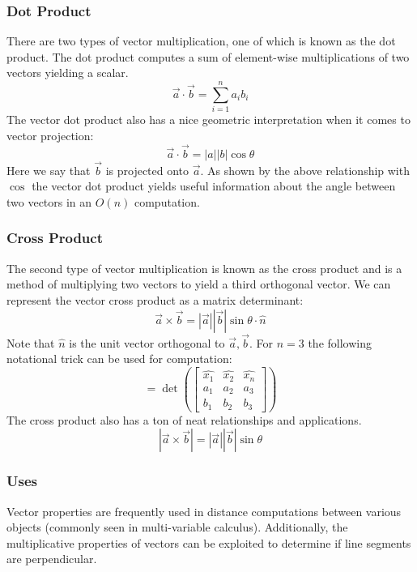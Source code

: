 \documentclass{article}
\begin{document}
\subsubsection{Dot Product}
There are two types of vector multiplication, one of which is known as the dot product. The dot product computes a sum of element-wise multiplications of two vectors yielding a scalar.
$$\vec{a}\cdot\vec{b}=\sum_{i=1}^{n}a_{i}b_{i}$$
The vector dot product also has a nice geometric interpretation when it comes to vector projection:
$$\vec{a}\cdot\vec{b}=|a||b|\cos\theta$$
Here we say that $\vec{b}$ is projected onto $\vec{a}$. As shown by the above relationship with $\cos$ the vector dot product yields useful information about the angle between two vectors in an $O(n)$ computation.

\subsubsection{Cross Product}
The second type of vector multiplication is known as the cross product and is a method of multiplying two vectors to yield a third orthogonal vector. We can represent the vector cross product as a matrix determinant:
$$\vec{a}\times\vec{b}=|\vec{a}||\vec{b}|\sin\theta\cdot\hat{n}$$
Note that $\hat{n}$ is the unit vector orthogonal to $\vec{a},\vec{b}$.
For $n=3$ the following notational trick can be used for computation:
$$=\det\left(
\begin{bmatrix}
\hat{x_{1}} & \hat{x_{2}} & \hat{x_{n}} \\
a_{1}       & a_{2}       & a_{3} \\
b_{1}       & b_{2}       & b_{3}
\end{bmatrix}
\right)$$
The cross product also has a ton of neat relationships and applications.
$$|\vec{a}\times\vec{b}|=|\vec{a}||\vec{b}|\sin\theta$$

\subsubsection{Uses}
Vector properties are frequently used in distance computations between various objects (commonly seen in multi-variable calculus). Additionally, the multiplicative properties of vectors can be exploited to determine if line segments are perpendicular. 
\end{document}

